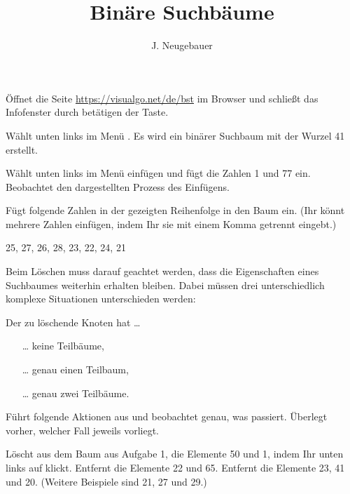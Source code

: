 \documentclass[10pt, a4paper]{scrartcl}
\author{J. Neugebauer}
\title{Binäre Suchbäume}
\date{\Heute}
\begin{document}
\ReiheTitel

\begin{wrapfig}
	\begin{wrapfigure}[4]{r}{0pt}
	\end{wrapfigure}
	Öffnet die Seite \url{https://visualgo.net/de/bst} im Browser und schließt das Infofenster durch betätigen der  Taste.
\end{wrapfig}

\begin{aufgabe}[subtitle=Einfügen,symbol=\symPartner\,\symLaptop]
\begin{teilaufgaben}
	\teilaufgabe Wählt unten links im Menü . Es wird ein binärer Suchbaum mit der Wurzel \num{41} erstellt.
	
	\teilaufgabe Wählt unten links im Menü einfügen und fügt die Zahlen \num{1} und \num{77} ein. Beobachtet den dargestellten Prozess des Einfügens.
	
	\teilaufgabe Fügt folgende Zahlen in der gezeigten Reihenfolge in den Baum ein. (Ihr könnt mehrere Zahlen einfügen, indem Ihr sie mit einem Komma getrennt eingebt.)
	
	\begin{center}
		\num{25}, \num{27}, \num{26}, \num{28}, \num{23}, \num{22}, \num{24}, \num{21}
	\end{center}

\end{teilaufgaben}
\end{aufgabe}

\begin{aufgabe}[subtitle=Löschen,symbol=\symPartner\,\symLaptop]
	Beim Löschen muss darauf geachtet werden, dass die Eigenschaften eines Suchbaumes weiterhin erhalten bleiben. Dabei müssen drei unterschiedlich komplexe Situationen unterschieden werden:
	
	Der zu löschende Knoten hat \dots
	\begin{enumerate}
		\item[\dots] keine Teilbäume,
		\item[\dots] genau einen Teilbaum,
		\item[\dots] genau zwei Teilbäume.
	\end{enumerate}

	Führt folgende Aktionen aus und beobachtet genau, was passiert. Überlegt vorher, welcher Fall jeweils vorliegt.
	
	\begin{teilaufgaben}
		\teilaufgabe Löscht aus dem Baum aus Aufgabe 1, die Elemente \num{50} und \num{1}, indem Ihr unten links auf  klickt.
		\teilaufgabe Entfernt die Elemente \num{22} und \num{65}.
		\teilaufgabe Entfernt die Elemente \num{23}, \num{41} und \num{20}. (Weitere Beispiele sind \num{21}, \num{27} und \num{29}.)
	\end{teilaufgaben}
\end{aufgabe}
\end{document}
